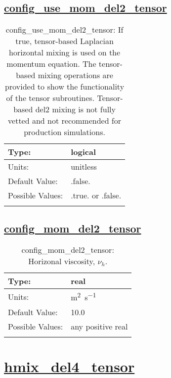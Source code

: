 \subsection[config\_use\_mom\_del2\_tensor]{\hyperref[sec:nm_tab_hmix_del2_tensor]{config\_use\_mom\_del2\_tensor}}
\label{subsec:nm_sec_config_use_mom_del2_tensor}
\begin{center}
\begin{longtable}{| p{2.0in} || p{4.0in} |}
    \hline
    Type: & logical \\
    \hline
    Units: & \si{unitless} \\
    \hline
    Default Value: & .false. \\
    \hline
    Possible Values: & .true. or .false. \\
    \hline
    \caption{config\_use\_mom\_del2\_tensor: If true, tensor-based Laplacian horizontal mixing is used on the momentum equation. The tensor-based mixing operations are provided to show the functionality of the tensor subroutines. Tensor-based del2 mixing is not fully vetted and not recommended for production simulations.}
\end{longtable}
\end{center}
\subsection[config\_mom\_del2\_tensor]{\hyperref[sec:nm_tab_hmix_del2_tensor]{config\_mom\_del2\_tensor}}
\label{subsec:nm_sec_config_mom_del2_tensor}
\begin{center}
\begin{longtable}{| p{2.0in} || p{4.0in} |}
    \hline
    Type: & real \\
    \hline
    Units: & \si{m^2.s^{-1}} \\
    \hline
    Default Value: & 10.0 \\
    \hline
    Possible Values: & any positive real \\
    \hline
    \caption{config\_mom\_del2\_tensor: Horizonal viscosity, $\nu_h$.}
\end{longtable}
\end{center}
\section[hmix\_del4\_tensor]{\hyperref[sec:nm_tab_hmix_del4_tensor]{hmix\_del4\_tensor}}
\label{sec:nm_sec_hmix_del4_tensor}

